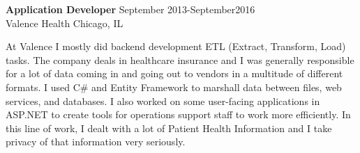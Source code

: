 \textbf{Application Developer} \hfill September 2013-September2016 \\
Valence Health \hfill Chicago, IL
\begin{description}  \itemsep -2pt %
\item At Valence I mostly did backend development ETL (Extract,
Transform, Load) tasks. The company deals in healthcare insurance and I
was generally responsible for a lot of data coming in and going out to
vendors in a multitude of different formats. I used C\# and Entity
Framework to marshall data between files, web services, and databases.
I also worked on some user-facing applications in ASP.NET
to create tools for operations support staff to work more efficiently.
In this line of work, I dealt with a lot of Patient Health Information
and I take privacy of that information very seriously.
\end{description}
